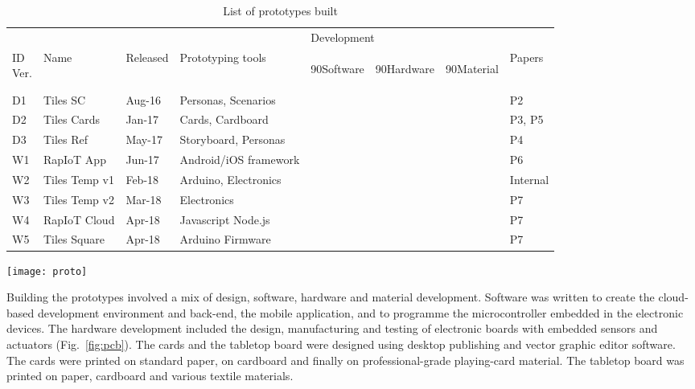 \begin{table}
	[!p] \centering \caption{List of prototypes built} \label{tab:prototypes} 
	\begin{threeparttable}
		\begin{tabular}{@{}llllllll@{}} 
			\toprule 
			& & & & \multicolumn{3}{l}{Development}  \\
			\cline{5-7} \noalign{\smallskip} 
			\specialcell[b]{ID\\Ver.} & Name & Released & Prototyping tools & 
			\begin{turn}
				{90}Software
			\end{turn}
			& 
			\begin{turn}
				{90}Hardware
			\end{turn}
			& 
			\begin{turn}
				{90}Material
			\end{turn}
			& Papers \\
			\midrule \noalign{\smallskip} 
			D1 & Tiles SC & Aug-16 & Personas, Scenarios & & & \textbullet & P2 \\
			D2 & Tiles Cards & Jan-17 & Cards, Cardboard & & & \textbullet & P3, P5 \\
			D3 & Tiles Ref & May-17 & Storyboard, Personas & & & \textbullet & P4 \\
			\hline \noalign{\smallskip} 
			W1 & RapIoT App & Jun-17 & Android/iOS framework & \textbullet & & & P6 \\
			W2 & Tiles Temp v1 & Feb-18 & Arduino, Electronics & \textbullet & \textbullet & & Internal \\
			W3 & Tiles Temp v2 & Mar-18 & Electronics & & \textbullet & & P7 \\
			W4 & RapIoT Cloud & Apr-18 & Javascript Node.js & \textbullet & & & P7 \\
			W5 & Tiles Square & Apr-18 & Arduino Firmware & \textbullet & & & P7 \\
			\bottomrule 
		\end{tabular}
		\begin{tablenotes}
			\item
			\texttt{[image: proto]}
		\end{tablenotes}
	\end{threeparttable}
\end{table}

Building the prototypes involved a mix of design, software, hardware and material development. Software was written to create the cloud-based development environment and back-end, the mobile application, and to programme the microcontroller embedded in the electronic devices. The hardware development included the design, manufacturing and testing of electronic boards with embedded sensors and actuators (Fig.~\ref{fig:pcb}). The cards and the tabletop board were designed using desktop publishing and vector graphic editor software. The cards were printed on standard paper, on cardboard and finally on professional-grade playing-card material. The tabletop board was printed on paper, cardboard and various textile materials.

